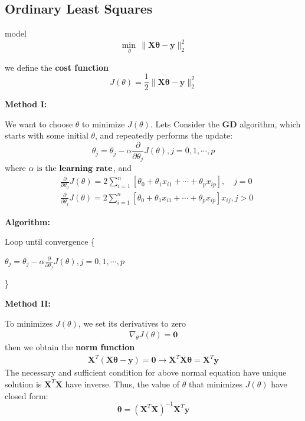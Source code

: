 \newpage
\subsection{Ordinary Least Squares}
\noindent model
\begin{equation}
\underset{\theta} {\min\,} {\| \mathbf{X}\mathbf{\theta} - \mathbf{y}\|_2^2} 
\end{equation}

\noindent we define the \textbf{cost function}
\begin{equation*}
	J(\theta) = \frac{1}{2} \| \mathbf{X}\mathbf{\theta} - \mathbf{y}\|_2^2
\end{equation*}

\noindent \textbf{Method I:}

\noindent We want to choose $\theta$ to minimize $J(\theta)$. Lets Consider the \textbf{GD} algorithm, which starts with some initial $\theta$, and repeatedly performs the update:
\begin{equation*}
	\theta_j = \theta_j - \alpha \frac{\partial}{\partial\theta_j}J(\theta), j = 0,1,\cdots,p
\end{equation*}
\noindent where $\alpha \text{ is the \textbf{learning rate}}$, and
\begin{align*}
	&\frac{\partial}{\partial\theta_0}J(\theta) = 2\sum_{i=1}^{n}[\theta_0 + \theta_1 x_{i1} + \cdots + \theta_p x_{ip}], \quad j = 0\\  
	&\frac{\partial}{\partial\theta_j}J(\theta) = 2\sum_{i=1}^{n}[\theta_0 + \theta_1 x_{i1} + \cdots + \theta_p x_{ip}]x_{ij}, j >0
\end{align*}

\noindent \textbf{Algorithm:}

Loop until convergence \{

	\qquad $\theta_j = \theta_j - \alpha \frac{\partial}{\partial\theta_j}J(\theta), j = 0,1,\cdots,p$

\}




\noindent \textbf{Method II:}

\noindent To minimizes $J(\theta)$, we set its derivatives to zero
\begin{align*}
			\nabla_{\theta} J(\theta) =  \mathbf{0}
\end{align*}
then we obtain the \textbf{norm function}
\begin{align*}
	\mathbf{X}^T(\mathbf{X}\mathbf{\theta} - \mathbf{y}) = \mathbf{0} \rightarrow \mathbf{X}^T\mathbf{X}\mathbf{\theta} = \mathbf{X}^T\mathbf{y}
\end{align*}
\noindent The necessary and sufficient condition for above normal equation have unique solution is $\mathbf{X}^T\mathbf{X}$ have inverse. Thus, the value of $\theta$ that minimizes $J(\theta)$ have closed form:
\[
\mathbf{\theta} = (\mathbf{X}^T\mathbf{X})^{-1}\mathbf{X}^T\mathbf{y}
\]


